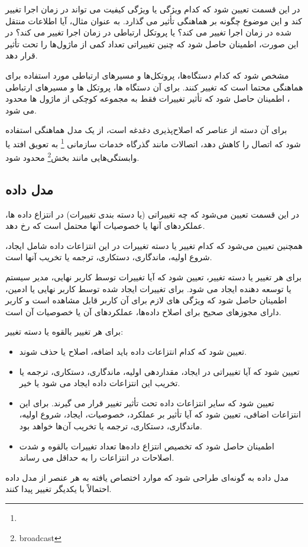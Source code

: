 در این قسمت تعیین شود که کدام ویژگی یا ویژگی کیفیت می تواند در زمان اجرا تغییر کند و این موضوع چگونه بر هماهنگی تأثیر می گذارد. 
به عنوان مثال، آیا اطلاعات منتقل شده در زمان اجرا تغییر می کند؟ یا پروتکل ارتباطی در زمان اجرا تغییر می کند؟
در این صورت، اطمینان حاصل شود که چنین تغییراتی تعداد کمی از ماژول‌ها را تحت تأثیر قرار دهد.

مشخص شود که کدام دستگاه‌ها، پروتکل‌ها و مسیرهای ارتباطی مورد استفاده برای هماهنگی محتما است که تغییر کنند. برای آن دستگاه ها، پروتکل ها و مسیرهای ارتباطی ، اطمینان حاصل شود که تأثیر تغییرات فقط به مجموعه کوچکی از ماژول ها محدود می شود.

برای آن دسته از عناصر که اصلاح‌پذیری دغدغه است، از یک مدل هماهنگی استفاده شود که اتصال را کاهش دهد، 
اتصالات مانند گذرگاه خدمات سازمانی
\footnote{} 
به تعویق افتد یا وابستگی‌هایی مانند بخش\footnote{broadcast}
محدود شود.
\subsection{مدل داده}
در این قسمت تعیین می‌شود که چه تغییراتی (یا دسته بندی تغییرات) در انتزاع داده ها، عملکردهای آنها یا خصوصیات آنها محتمل است که رخ دهد.

همچنین تعیین می‌‌شود که کدام تغییر یا دسته تغییرات در این انتزاعات داده شامل ایجاد، شروع اولیه، ماندگاری، دستکاری، ترجمه یا تخریب آنها است.

برای هر تغییر یا دسته تغییر، تعیین شود که آیا تغییرات توسط کاربر نهایی، مدیر سیستم یا توسعه دهنده ایجاد می شود. برای تغییرات ایجاد شده توسط کاربر نهایی یا ادمین، اطمینان حاصل شود که ویژگی های لازم برای آن کاربر قابل مشاهده است و کاربر دارای مجوزهای صحیح برای اصلاح داده‌ها، عملکردهای آن یا خصوصیات آن است.

برای هر تغییر بالقوه یا دسته تغییر:

\begin{itemize}
\item
تعیین شود که کدام انتزاعات داده باید اضافه، اصلاح یا حذف شوند.
\item
تعیین شود که آیا تغییراتی در ایجاد، مقداردهی اولیه، ماندگاری، دستکاری، ترجمه یا تخریب این انتزاعات داده ایجاد می شود یا خیر.
\item
تعیین شود که سایر انتزاعات داده تحت تأثیر تغییر قرار می گیرند.
برای این انتزاعات اضافی، تعیین شود که آیا تأثیر بر عملکرد، خصوصیات، ایجاد، شروع اولیه، ماندگاری، دستکاری، ترجمه یا تخریب آن‌ها خواهد بود.
\item
اطمینان حاصل شود که 
تخصیص انتزاع داده‌ها تعداد تغییرات بالقوه و شدت اصلاحات در انتزاعات را به حداقل می رساند.
\end{itemize}
مدل داده به گونه‌ای طراحی شود که موارد اختصاص یافته به هر عنصر از مدل داده احتمالاً با یکدیگر تغییر پیدا کنند.


